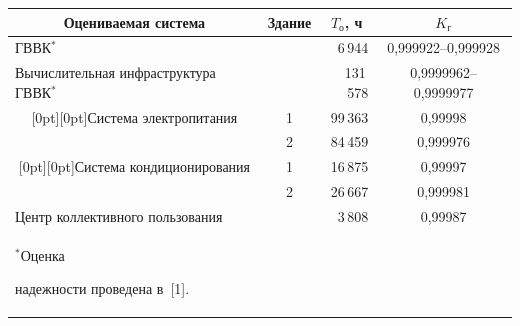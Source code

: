 \begin{table}\small %

\begin{center}


\vspace*{2ex}



\tabcolsep=4pt

\begin{tabular}{|l|c|r|c|}

\hline

\multicolumn{1}{|c|}{Оцениваемая система}&Здание&

\multicolumn{1}{c|}{$T_{\mathrm{о}}$, ч}&$K_{\mathrm{г}}$\\

\hline

ГВВК$^*$&&6\,944&0,999922--0,999928\\

\hline

Вычислительная инфраструктура ГВВК$^*$&&131\,578&0,9999962--0,9999977\\

\hline

\multicolumn{1}{|c|}{\raisebox{-6pt}[0pt][0pt]{Система электропитания}}&1&99\,363&0,99998\\

&2&84\,459&\hphantom{9}0,999976 \\

\hline

\multicolumn{1}{|c|}{\raisebox{-6pt}[0pt][0pt]{Система кондиционирования}}&1&16\,875&0,99997\\

&2&26\,667&\hphantom{9}0,999981\\

\hline

Центр коллективного пользования&&3\,808&0,99987\\

\hline

      \multicolumn{4}{l}{\footnotesize \hspace*{2mm}$^*$Оценка 

надежности проведена в~[1].}

      \end{tabular}

      \end{center}

      \end{table}



